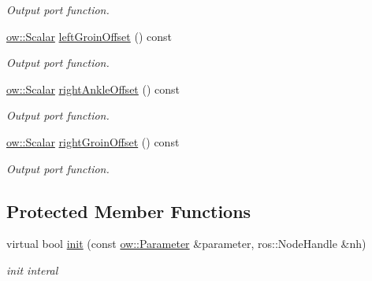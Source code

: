 \begin{DoxyCompactItemize}
\begin{DoxyCompactList}\small\item\em Output port function. \end{DoxyCompactList}\item 
\hyperlink{types_8h_ac412879ee4a239c8032aa2d647f4a74a}{ow\+::\+Scalar} \hyperlink{classow__joint__tracker_1_1JointTracker_ad55380ea860fc9a2269fb124166c01ed}{left\+Groin\+Offset} () const 
\begin{DoxyCompactList}\small\item\em Output port function. \end{DoxyCompactList}\item 
\hyperlink{types_8h_ac412879ee4a239c8032aa2d647f4a74a}{ow\+::\+Scalar} \hyperlink{classow__joint__tracker_1_1JointTracker_a9348bc94acdc330642adf4c23a6250b6}{right\+Ankle\+Offset} () const 
\begin{DoxyCompactList}\small\item\em Output port function. \end{DoxyCompactList}\item 
\hyperlink{types_8h_ac412879ee4a239c8032aa2d647f4a74a}{ow\+::\+Scalar} \hyperlink{classow__joint__tracker_1_1JointTracker_ae742bb9f8ef753a664ad612bab6fb962}{right\+Groin\+Offset} () const 
\begin{DoxyCompactList}\small\item\em Output port function. \end{DoxyCompactList}\end{DoxyCompactItemize}
\subsection*{Protected Member Functions}
\begin{DoxyCompactItemize}
\item 
virtual bool \hyperlink{classow__joint__tracker_1_1JointTracker_a39a2e5dd308b1653205b255ecdd31ffb}{init} (const \hyperlink{classow_1_1Parameter}{ow\+::\+Parameter} \&parameter, ros\+::\+Node\+Handle \&nh)
\begin{DoxyCompactList}\small\item\em init interal \end{DoxyCompactList}\end{DoxyCompactItemize}
